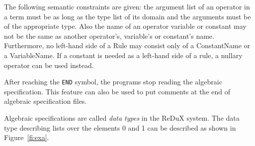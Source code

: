 




The following
semantic constraints are given: the argument list of an operator in a term must
be as long as the type list of its domain and the arguments must be of the
appropriate type. Also the name of an operator variable or constant
may not be the same as another operator's, variable's or constant's name.
Furthermore, no left-hand side of a Rule may consist only of a ConstantName
or a VariableName. If a constant is needed as a left-hand side of a
rule, a nullary operator can be used instead.

After reaching the {\tt END} symbol, the programs stop reading the
algebraic specification. This feature can also be used to put
comments at the end of algebraic specification files.

Algebraic specifications are called {\em data types} in the ReDuX system.
The data type describing lists over the elements 0 and 1 can be described as
shown in Figure~\ref{fi:exa}.


